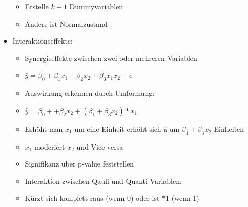 \documentclass[a4paper]{article}
\begin{document}
\begin{landscape}
\begin{multicols}{3}
\begin{itemize}[noitemsep,nolistsep,leftmargin=*]
\begin{itemize}[noitemsep,nolistsep,leftmargin=*]
                \item Erstelle $k-1$ Dummyvariablen
                \item Andere ist Normalzustand
            \end{itemize}
            \item Interaktionseffekte:
            \begin{itemize}[noitemsep,nolistsep,leftmargin=*]
                \item Synergieeffekte zwischen zwei oder mehreren Variablen
                \item $\hat{y}=\beta_0+\beta_1x_1+\beta_2x_2+\beta_3x_1x_2+\epsilon$
                \item Auswirkung erkennen durch Umformung:
                \item $\hat{y}=\beta_0++\beta_2x_2+ (\beta_1+\beta_3x_2)*x_1$
                \item Erhöht man $x_1$ um eine Einheit erhöht sich $\hat{y}$ um $\beta_1+\beta_3x_2$ Einheiten
                \item $x_1$ moderiert $x_2$ und Vice versa
                \item Signifikanz über p-value feststellen
                \item Interaktion zwischen Qauli und Quanti Variablen:
                \item Kürzt sich komplett raus (wenn 0) oder ist $*1$ (wenn 1)
            \end{itemize}
        \end{itemize}



\end{multicols}
\end{landscape}
\end{document}
